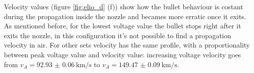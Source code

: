 Velocity values (figure \ref{fig:elio_d} (f)) show how the bullet behaviour is costant during the propagation inside the nozzle and becames more erratic once it exits.
As mentioned before, for the lowest voltage value the bullet stops right after it exits the nozzle, in this configuration it's not possible to find a propagation velocity in air. For other sets velocity has the same profile, with a proportionality between peak voltage value and velocity value: increasing voltage velocity goes from $v_{A} = \SI{92.93(6)}{\kilo\meter/\second}$ to $v_{A} = \SI{149.47(9)}{\kilo\meter/\second}$.
\begin{figure}
 \centering
 \hfill
 \hfill
\end{figure}

